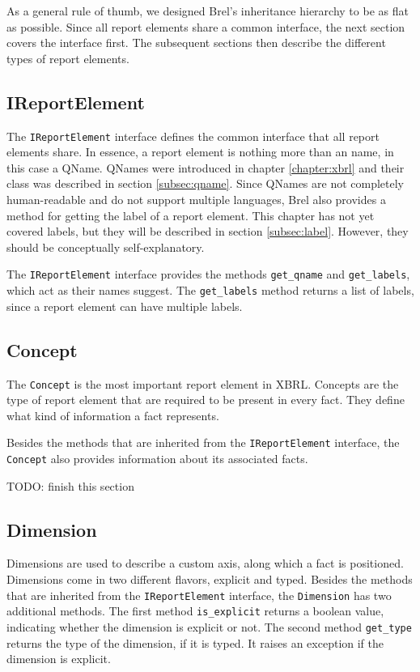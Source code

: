As a general rule of thumb, we designed Brel's inheritance hierarchy to be as flat as possible.
Since all report elements share a common interface, the next section covers the interface first.
The subsequent sections then describe the different types of report elements.

\subsection{IReportElement}

The \texttt{IReportElement} interface defines the common interface that all report elements share.
In essence, a report element is nothing more than an name, in this case a QName.
QNames were introduced in chapter \ref{chapter:xbrl} and their class was described in section \ref{subsec:qname}.
Since QNames are not completely human-readable and do not support multiple languages,
Brel also provides a method for getting the label of a report element.
This chapter has not yet covered labels, but they will be described in section \ref{subsec:label}.
However, they should be conceptually self-explanatory.

The \texttt{IReportElement} interface provides the methods \texttt{get\_qname} and \texttt{get\_labels}, 
which act as their names suggest.
The \texttt{get\_labels} method returns a list of labels, since a report element can have multiple labels.

\subsection{Concept}

The \texttt{Concept} is the most important report element in XBRL.
Concepts are the type of report element that are required to be present in every fact.
They define what kind of information a fact represents.

Besides the methods that are inherited from the \texttt{IReportElement} interface,
the \texttt{Concept} also provides information about its associated facts.

TODO: finish this section

\subsection{Dimension}

Dimensions are used to describe a custom axis, along which a fact is positioned.
Dimensions come in two different flavors, explicit and typed.
Besides the methods that are inherited from the \texttt{IReportElement} interface,
the \texttt{Dimension} has two additional methods.
The first method \texttt{is\_explicit} returns a boolean value, indicating whether the dimension is explicit or not.
The second method \texttt{get\_type} returns the type of the dimension, if it is typed.
It raises an exception if the dimension is explicit.

